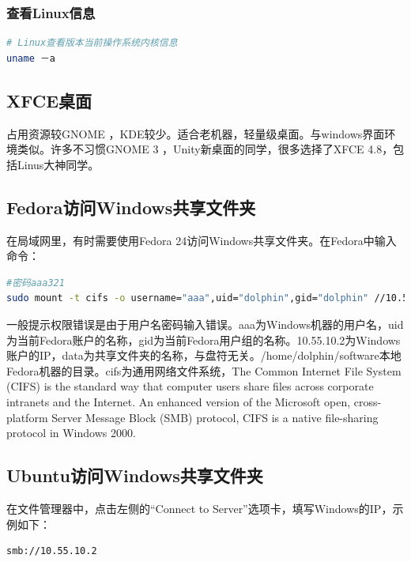 \documentclass[letter]{book}
\begin{document}
\subsubsection{查看Linux信息}

\begin{lstlisting}[language=Bash]
# Linux查看版本当前操作系统内核信息
uname －a 
\end{lstlisting}

\subsection{XFCE桌面}

占用资源较GNOME ，KDE较少。适合老机器，轻量级桌面。与windows界面环境类似。许多不习惯GNOME 3 ，Unity新桌面的同学，很多选择了XFCE 4.8，包括Linus大神同学。

\subsection{Fedora访问Windows共享文件夹}

在局域网里，有时需要使用Fedora 24访问Windows共享文件夹。在Fedora中输入命令：

\begin{lstlisting}[language=Bash]
#密码aaa321
sudo mount -t cifs -o username="aaa",uid="dolphin",gid="dolphin" //10.55.10.2/data /home/dolphin/software
\end{lstlisting}

一般提示权限错误是由于用户名密码输入错误。aaa为Windows机器的用户名，uid为当前Fedora账户的名称，gid为当前Fedora用户组的名称。10.55.10.2为Windows账户的IP，data为共享文件夹的名称，与盘符无关。/home/dolphin/software本地Fedora机器的目录。cifs为通用网络文件系统，The Common Internet File System (CIFS) is the standard way that computer users share files across corporate intranets and the Internet. An enhanced version of the Microsoft open, cross-platform Server Message Block (SMB) protocol, CIFS is a native file-sharing protocol in Windows 2000.

\subsection{Ubuntu访问Windows共享文件夹}

在文件管理器中，点击左侧的“Connect to Server”选项卡，填写Windows的IP，示例如下：

\begin{lstlisting}[language=HTML]
smb://10.55.10.2
\end{lstlisting}
\end{document}
